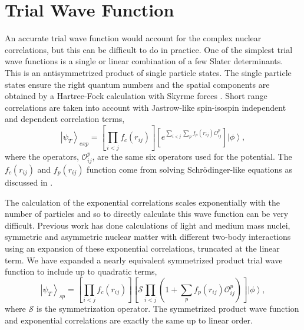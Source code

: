 \documentclass[aps,prl,reprint,superscriptaddress]{revtex4-1}
\newcommand{\ket}[1]{\left| #1 \right>}
\newcommand{\fpij}{f_p(r_{ij})}
\newcommand{\Opij}{\mathcal{O}_{ij}^p}
\begin{document}
\section{Trial Wave Function}
An accurate trial wave function would account for the complex nuclear correlations, but this can be difficult to do in practice. One of the simplest trial wave functions is a single or linear combination of a few Slater determinants. This is an antisymmetrized product of single particle states. The single particle states ensure the right quantum numbers and the spatial components are obtained by a Hartree-Fock calculation with Skyrme forces \cite{gandolfi2014}. Short range correlations are taken into account with Jastrow-like spin-isospin independent and dependent correlation terms,
\begin{equation}
   \ket{\psi_T}_{exp} = \left[\prod\limits_{i<j}f_c(r_{ij})\right] \left[e^{\sum\limits_{i<j}\sum\limits_p\fpij\Opij}\right] \ket{\phi},
\end{equation}
   where the operators, $\Opij$, are the same six operators used for the potential. The $f_c(r_{ij})$ and $f_p(r_{ij})$ function come from solving Schr\"odinger-like equations as discussed in \cite{pandharipande1979}.

The calculation of the exponential correlations scales exponentially with the number of particles and so to directly calculate this wave function can be very difficult. Previous work \cite{gandolfi2014} has done calculations of light and medium mass nuclei, symmetric and asymmetric nuclear matter with different two-body interactions using an expansion of these exponential correlations, truncated at the linear term. We have expanded a nearly equivalent symmetrized product trial wave function to include up to quadratic terms,
\begin{equation}
   \ket{\psi_T}_{sp} = \left[\prod\limits_{i<j}f_c(r_{ij})\right]\left[\mathcal{S}\prod\limits_{i<j}\left(1+\sum\limits_p \fpij\Opij\right)\right]\ket{\phi},
\end{equation}
where $\mathcal{S}$ is the symmetrization operator. The symmetrized product wave function and exponential correlations are exactly the same up to linear order.
\end{document}
